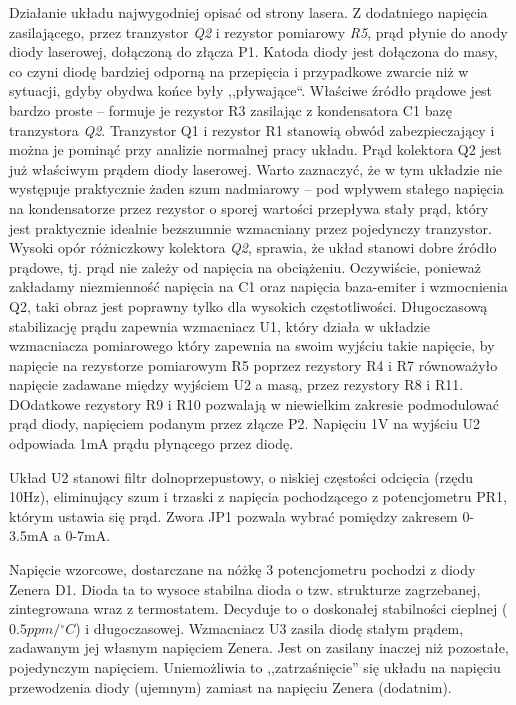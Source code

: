 \documentclass[a4paper,10pt]{article}
\begin{document}
Działanie układu najwygodniej opisać od strony lasera. Z dodatniego napięcia zasilającego, przez tranzystor \textit{Q2} i rezystor pomiarowy \textit{R5}, prąd płynie do anody diody laserowej, dołączoną do złącza P1. Katoda diody jest dołączona do masy, co czyni diodę bardziej odporną na przepięcia i przypadkowe zwarcie niż w sytuacji, gdyby obydwa końce były ,,pływające``.  
Właściwe źródło prądowe jest bardzo proste -- formuje je rezystor R3 zasilając z kondensatora C1 bazę tranzystora \textit{Q2}. Tranzystor Q1 i rezystor R1 stanowią obwód zabezpieczający i można je pominąć przy analizie normalnej pracy układu. Prąd kolektora Q2 jest już właściwym prądem diody laserowej. Warto zaznaczyć, że w tym układzie nie występuje praktycznie żaden szum nadmiarowy -- pod wpływem stałego napięcia na kondensatorze przez rezystor o sporej wartości przepływa stały prąd, który jest praktycznie idealnie bezszumnie wzmacniany przez pojedynczy tranzystor. Wysoki opór różniczkowy kolektora \textit{Q2}, sprawia, że układ stanowi dobre źródło prądowe, tj. prąd nie zależy od napięcia na obciążeniu. Oczywiście, ponieważ zakładamy niezmienność napięcia na C1 oraz napięcia baza-emiter i wzmocnienia Q2, taki obraz jest poprawny tylko dla wysokich częstotliwości. Długoczasową stabilizację prądu zapewnia wzmacniacz U1, który działa w układzie wzmacniacza pomiarowego który zapewnia na swoim wyjściu takie napięcie, by napięcie na rezystorze pomiarowym R5 poprzez rezystory R4 i R7 równoważyło napięcie zadawane między wyjściem U2 a masą, przez rezystory  R8 i R11.
DOdatkowe rezystory R9 i R10 pozwalają w niewielkim zakresie podmodulować prąd diody, napięciem podanym przez złącze P2.
Napięciu 1V na wyjściu U2 odpowiada 1mA prądu płynącego przez diodę.

Układ U2 stanowi filtr dolnoprzepustowy, o niskiej częstości odcięcia (rzędu 10Hz), eliminujący szum i trzaski z napięcia pochodzącego z potencjometru PR1, którym ustawia się prąd. Zwora JP1 pozwala wybrać pomiędzy zakresem 0-3.5mA a 0-7mA.

Napięcie wzorcowe, dostarczane na nóżkę 3 potencjometru pochodzi z diody Zenera D1. Dioda ta to wysoce stabilna dioda o tzw. strukturze zagrzebanej, zintegrowana wraz z termostatem. Decyduje to o doskonałej stabilności cieplnej ($0.5ppm/{}^{\circ}C$) i długoczasowej.  Wzmacniacz U3 zasila diodę stałym prądem, zadawanym jej własnym napięciem Zenera. Jest on zasilany inaczej niż pozostałe, pojedynczym napięciem. Uniemożliwia to ,,zatrzaśnięcie'' się układu na napięciu przewodzenia diody (ujemnym) zamiast na napięciu Zenera (dodatnim). 
\end{document}
